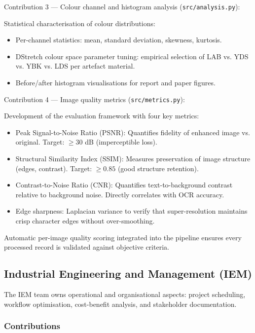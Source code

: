 Contribution 3 — Colour channel and histogram analysis (\texttt{src/analysis.py}):

Statistical characterisation of colour distributions:
\begin{itemize}
	\item Per-channel statistics: mean, standard deviation, skewness, kurtosis.
	\item DStretch colour space parameter tuning: empirical selection of LAB vs. YDS vs. YBK vs. LDS per artefact material.
	\item Before/after histogram visualisations for report and paper figures.
\end{itemize}

Contribution 4 — Image quality metrics (\texttt{src/metrics.py}):

Development of the evaluation framework with four key metrics:

\begin{itemize}
	\item Peak Signal-to-Noise Ratio (PSNR): Quantifies fidelity of enhanced image vs. original. Target: $\geq 30$ dB (imperceptible loss).
	
	\item Structural Similarity Index (SSIM): Measures preservation of image structure (edges, contrast). Target: $\geq 0.85$ (good structure retention).
	
	\item Contrast-to-Noise Ratio (CNR): Quantifies text-to-background contrast relative to background noise. Directly correlates with OCR accuracy.
	
	\item Edge sharpness: Laplacian variance to verify that super-resolution maintains crisp character edges without over-smoothing.
\end{itemize}

Automatic per-image quality scoring integrated into the pipeline ensures every processed record is validated against objective criteria.

\subsection{Industrial Engineering and Management (IEM)}

The IEM team owns operational and organisational aspects: project scheduling, workflow optimisation, cost-benefit analysis, and stakeholder documentation.

\subsubsection{Contributions}


